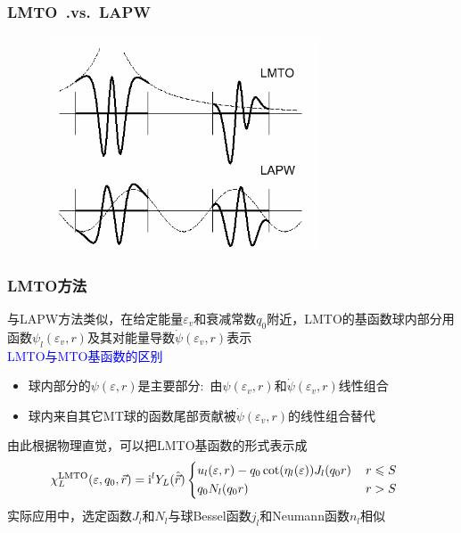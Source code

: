 \frame
{
	\frametitle{\textrm{LMTO~.vs.~LAPW}}
\begin{figure}[h!]
\centering
\vspace*{-0.15in}
\includegraphics[height=2.50in,width=3.30in,viewport=0 0 440 350,clip]{Figures/LMTO-vs-LAPW.png}
\caption{\fontsize{5.5pt}{4.2pt}}%
\label{LMTO-vs-LAPW}
\end{figure}
}

\frame
{
	\frametitle{\textrm{LMTO}方法}
	与\textrm{LAPW}方法类似，在给定能量$\varepsilon_v$和衰减常数$q_0$附近，\textrm{LMTO}的基函数球内部分用函数$\psi_l(\varepsilon_v,r)$及其对能量导数$\dot\psi(\varepsilon_v,r)$表示\\
\textcolor{blue}{\textrm{LMTO}与\textrm{MTO}基函数的区别}
	\begin{itemize}
		\item 球内部分的$\psi(\varepsilon,r)$是主要部分:~由$\psi(\varepsilon_v,r)$和$\dot\psi(\varepsilon_v,r)$线性组合
		\item 球内来自其它\textrm{MT}球的函数尾部贡献被$\dot\psi(\varepsilon_v,r)$的线性组合替代
	\end{itemize}
	由此根据物理直觉，可以把\textrm{LMTO}基函数的形式表示成
		\begin{displaymath}
			\hspace*{-12pt}\chi_L^{\mathrm{LMTO}}(\varepsilon,q_0,\vec r)=\mathrm{i}^lY_L(\hat{\vec r})\left\{
			\begin{aligned}
				&u_l(\varepsilon,r)-q_0\cot(\eta_l(\varepsilon))J_l(q_0r)&\, r\leqslant S\\
				&q_0N_l(q_0r)&\, r>S
			\end{aligned}\right.
		\end{displaymath}
		实际应用中，选定函数$J_l$和$N_l$与球\textrm{Bessel}函数$j_l$和\textrm{Neumann}函数$n_l$相似
}

